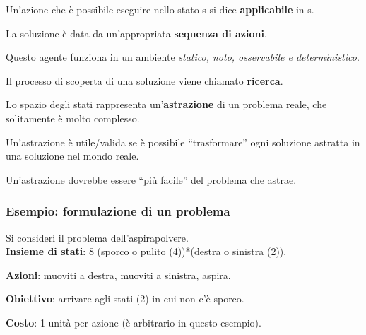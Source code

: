 Un'azione che è possibile eseguire nello stato s si dice \textbf{applicabile} in s.

La soluzione è data da un'appropriata \textbf{sequenza di azioni}.

Questo agente funziona in un ambiente \textit{statico, noto, osservabile e
deterministico}.

Il processo di scoperta di una soluzione viene chiamato \textbf{ricerca}.

Lo spazio degli stati rappresenta un'\textbf{astrazione} di un problema reale,
che solitamente è molto complesso.

Un'astrazione è utile/valida se è possibile ``trasformare'' ogni soluzione
astratta in una soluzione nel mondo reale.

Un'astrazione dovrebbe essere ``più facile'' del problema che astrae.

\subsubsection{Esempio: formulazione di un problema}

Si consideri il problema dell'aspirapolvere. \\

\textbf{Insieme di stati}: 8 (sporco o pulito (4))*(destra o sinistra (2)).

\textbf{Azioni}: muoviti a destra, muoviti a sinistra, aspira.

\textbf{Obiettivo}: arrivare agli stati (2) in cui non c'è sporco.

\textbf{Costo}: 1 unità per azione (è arbitrario in questo esempio).








